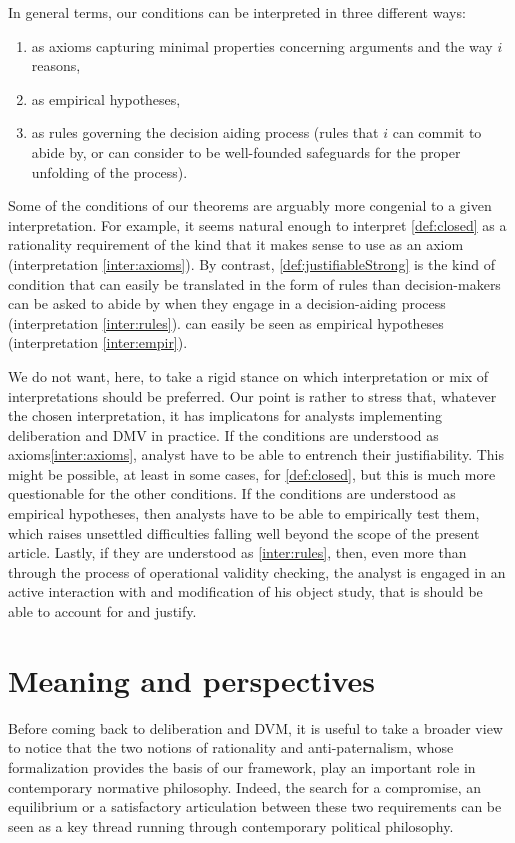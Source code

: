 \documentclass[smallextended,nospthms,natbib]{svjour3}
\begin{document}
In general terms, our conditions can be interpreted in three different ways:
\begin{enumerate}[label=({\roman*})]%
	\item \label{inter:axioms} as axioms capturing minimal properties concerning arguments and the way $i$ reasons,
	\item \label{inter:empir} as empirical hypotheses,
	\item \label{inter:rules} as rules governing the decision aiding process (rules that $i$ can commit to abide by, or can consider to be well-founded safeguards for the proper unfolding of the process).
\end{enumerate}

Some of the conditions of our theorems are arguably more congenial to a given interpretation. For example, it seems natural enough to interpret \cref{def:closed} as a rationality requirement of the kind that it makes sense to use as an axiom (interpretation \ref{inter:axioms}). By contrast, \cref{def:justifiableStrong} is the kind of condition that can easily be translated in the form of rules than decision-makers can be asked to abide by when they engage in a decision-aiding process (interpretation \ref{inter:rules}).  can easily be seen as empirical hypotheses (interpretation \ref{inter:empir}).

We do not want, here, to take a rigid stance on which interpretation or mix of interpretations should be preferred. Our point is rather to stress that, whatever the chosen interpretation, it has implicatons for analysts implementing deliberation and DMV in practice. If the conditions are understood as axioms\ref{inter:axioms}, analyst have to be able to entrench their justifiability. This might be possible, at least in some cases, for \cref{def:closed}, but this is much more questionable for the other conditions. If the conditions are understood as empirical hypotheses, then analysts have to be able to empirically test them, which raises unsettled difficulties falling well beyond the scope of the present article. Lastly, if they are understood as \ref{inter:rules}, then, even more than through the process of operational validity checking, the analyst is engaged in an active interaction with and modification of his object study, that is should be able to account for and justify.

\section{Meaning and perspectives}
\label{disc}
Before coming back to deliberation and DVM, it is useful to take a broader view to notice that the two notions of rationality and anti-paternalism, whose formalization provides the basis of our framework, play an important role in contemporary normative philosophy. Indeed, the search for a compromise, an equilibrium or a satisfactory articulation between these two requirements can be seen as a key thread running through contemporary political philosophy.
\end{document}

